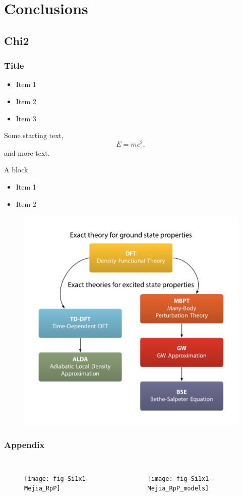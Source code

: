 \documentclass{beamer}
\begin{document}
\section{Conclusions}

\subsection{Chi2}
\begin{frame}
\frametitle{Title}
\begin{itemize}
\item Item 1
\item Item 2
\item Item 3
\end{itemize}
\end{frame}

\begin{frame}
Some starting text,
\begin{equation*}
E = mc^{2},
\end{equation*}
and more text.
\begin{block}{A block}
\begin{itemize}
\item Item 1
\item Item 2
\end{itemize}
\end{block}
\end{frame}

\begin{frame}
\begin{figure}
\centering
\includegraphics[height=\textheight]{diag-methods}
\end{figure}
\end{frame}

\begin{frame}
\frametitle{Appendix}
\begin{columns}
\begin{figure}
\centering
\texttt{[image: fig-Si1x1-Mejia\_RpP]}
\end{figure}
\begin{figure}
\centering
\texttt{[image: fig-Si1x1-Mejia\_RpP\_models]}
\end{figure}
\end{columns}
\end{frame}
\end{document}
